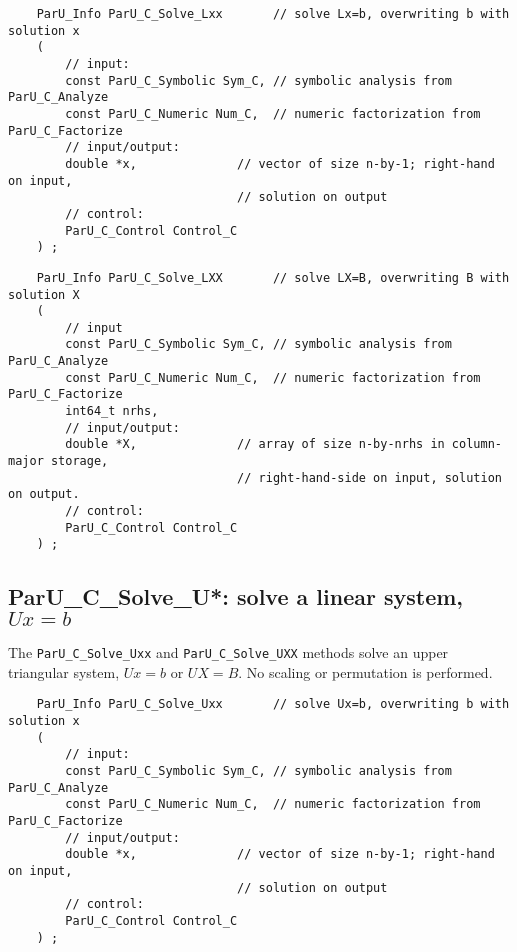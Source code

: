 \documentclass[12pt]{article}
\begin{document}
    {\footnotesize
    \begin{verbatim}
    ParU_Info ParU_C_Solve_Lxx       // solve Lx=b, overwriting b with solution x
    (
        // input:
        const ParU_C_Symbolic Sym_C, // symbolic analysis from ParU_C_Analyze
        const ParU_C_Numeric Num_C,  // numeric factorization from ParU_C_Factorize
        // input/output:
        double *x,              // vector of size n-by-1; right-hand on input,
                                // solution on output
        // control:
        ParU_C_Control Control_C
    ) ; \end{verbatim} }

    {\footnotesize
    \begin{verbatim}
    ParU_Info ParU_C_Solve_LXX       // solve LX=B, overwriting B with solution X
    (
        // input
        const ParU_C_Symbolic Sym_C, // symbolic analysis from ParU_C_Analyze
        const ParU_C_Numeric Num_C,  // numeric factorization from ParU_C_Factorize
        int64_t nrhs,
        // input/output:
        double *X,              // array of size n-by-nrhs in column-major storage,
                                // right-hand-side on input, solution on output.
        // control:
        ParU_C_Control Control_C
    ) ; \end{verbatim} }

\subsection{{\sf ParU\_C\_Solve\_U*}: solve a linear system, $Ux=b$}

    The \verb'ParU_C_Solve_Uxx' and \verb'ParU_C_Solve_UXX' methods solve an
    upper triangular system, $Ux=b$ or $UX=B$.  No scaling or permutation is
    performed.

    {\footnotesize
    \begin{verbatim}
    ParU_Info ParU_C_Solve_Uxx       // solve Ux=b, overwriting b with solution x
    (
        // input:
        const ParU_C_Symbolic Sym_C, // symbolic analysis from ParU_C_Analyze
        const ParU_C_Numeric Num_C,  // numeric factorization from ParU_C_Factorize
        // input/output:
        double *x,              // vector of size n-by-1; right-hand on input,
                                // solution on output
        // control:
        ParU_C_Control Control_C
    ) ; \end{verbatim} }
\end{document}
